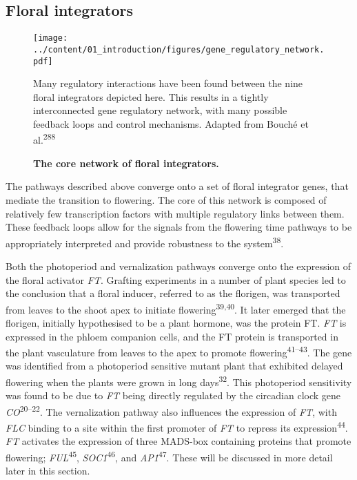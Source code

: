 \documentclass[12pt,]{book}
\begin{document}
\subsection{Floral integrators}\label{section:intro:floralintegrators}

\begin{figure}[htbp]
\texttt{[image: ../content/01\_introduction/figures/gene\_regulatory\_network.pdf]}
\caption{\textbf{The core network of floral integrators.}}{Many
regulatory interactions have been found between the nine floral
integrators depicted here. This results in a tightly interconnected gene
regulatory network, with many possible feedback loops and control
mechanisms. Adapted from Bouché et
al.\textsuperscript{288}}\label{figure:1xx:floralnetwork}
\end{figure}

The pathways described above converge onto a set of floral integrator
genes, that mediate the transition to flowering. The core of this
network is composed of relatively few transcription factors with
multiple regulatory links between them. These feedback loops allow for
the signals from the flowering time pathways to be appropriately
interpreted and provide robustness to the system\textsuperscript{38}.

Both the photoperiod and vernalization pathways converge onto the
expression of the floral activator \emph{FT}. Grafting experiments in a
number of plant species led to the conclusion that a floral inducer,
referred to as the florigen, was transported from leaves to the shoot
apex to initiate flowering\textsuperscript{39,40}. It later emerged that
the florigen, initially hypothesised to be a plant hormone, was the
protein FT. \emph{FT} is expressed in the phloem companion cells, and
the FT protein is transported in the plant vasculature from leaves to
the apex to promote flowering\textsuperscript{41--43}. The gene was
identified from a photoperiod sensitive mutant plant that exhibited
delayed flowering when the plants were grown in long
days\textsuperscript{32}. This photoperiod sensitivity was found to be
due to \emph{FT} being directly regulated by the circadian clock gene
\emph{CO}\textsuperscript{20--22}. The vernalization pathway also
influences the expression of \emph{FT}, with \emph{FLC} binding to a
site within the first promoter of \emph{FT} to repress its
expression\textsuperscript{44}. \emph{FT} activates the expression of
three MADS-box containing proteins that promote flowering;
\emph{FUL}\textsuperscript{45}, \emph{SOC1}\textsuperscript{46}, and
\emph{AP1}\textsuperscript{47}. These will be discussed in more detail
later in this section.
\end{document}
